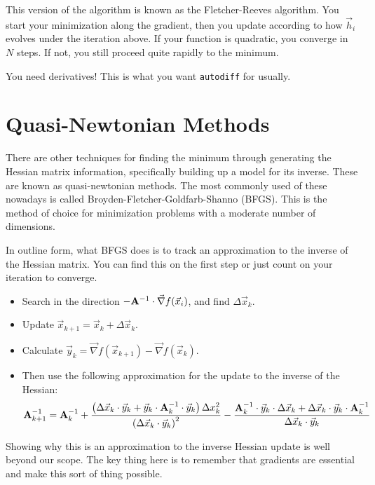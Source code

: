 This version of the algorithm is known as the Fletcher-Reeves
algorithm. You start your minimization along the gradient, then you
update according to how $\vec{h}_i$ evolves under the iteration
above. If your function is quadratic, you converge in $N$ steps. If
not, you still proceed quite rapidly to the minimum.

You need derivatives! This is what you want {\tt autodiff} for
usually.

\section{Quasi-Newtonian Methods}

There are other techniques for finding the minimum through generating
the Hessian matrix information, specifically building up a model for
its inverse. These are known as quasi-newtonian methods. The most
commonly used of these nowadays is called
Broyden-Fletcher-Goldfarb-Shanno (BFGS).  This is the method of choice
for minimization problems with a moderate number of dimensions.

In outline form, what BFGS does is to track an approximation to the
inverse of the Hessian matrix. You can find this on the first step or
just count on your iteration to converge.
\begin{itemize}
 \item Search in the direction
 $-{\bf A}^{-1}\cdot \vec{\nabla}f(\vec{x}_i)$, and find
 $\Delta\vec{x}_k$.
 \item Update $\vec{x}_{k+1} = \vec{x}_k + \Delta\vec{x}_k$.
 \item Calculate $\vec{y}_k = \vec{\nabla}f(\vec{x}_{k+1})
 - \vec{\nabla}f(\vec{x}_k)$.
 \item Then use the following approximation for the update to the
 inverse of the Hessian:
 \begin{equation}
   {\bf A}^{-1}_{k+1} = {\bf A}^{-1}_k +
   \frac{\left(\Delta\vec{x}_k\cdot\vec{y}_k
 + \vec{y}_k\cdot{\bf A}^{-1}_k\cdot\vec{y}_k \right) \Delta x_k^2}
   {\left(\Delta\vec{x}_k\cdot\vec{y}_k\right)^2}
 - \frac{{\bf A}^{-1}_k\cdot\vec{y}_k\cdot\Delta\vec{x}_k
 + \Delta\vec{x}_k \cdot\vec{y}_k\cdot{\bf A}^{-1}_k}{\Delta\vec{x}_k\cdot\vec{y}_k}
 \end{equation}
\end{itemize}

Showing why this is an approximation to the inverse Hessian update is
well beyond our scope. The key thing here is to remember that
gradients are essential and make this sort of thing possible.
